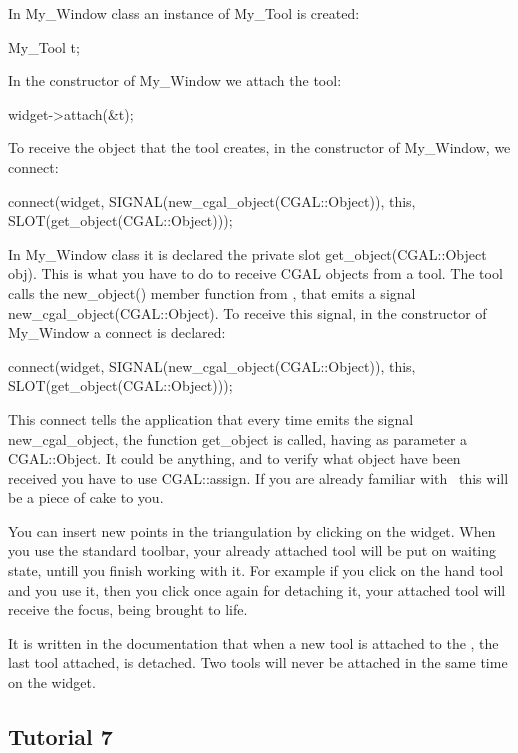 In My\_Window class an instance of My\_Tool is created:
\begin{ccExampleCode}
My_Tool t;
\end{ccExampleCode}
In the constructor of My\_Window we attach the tool:
\begin{ccExampleCode}
widget->attach(&t);
\end{ccExampleCode}

To receive the object that the tool creates, in the constructor of My\_Window, 
we connect:
\begin{ccExampleCode}
connect(widget, SIGNAL(new_cgal_object(CGAL::Object)), 
            this, SLOT(get_object(CGAL::Object)));
\end{ccExampleCode}
In My\_Window class it is declared the private slot get\_object(CGAL::Object obj). 
This is what you have to do to receive CGAL objects from a tool. The
tool calls the new\_object() member function from , that emits
a signal new\_cgal\_object(CGAL::Object). To receive this signal, in the
constructor of My\_Window a connect is declared:
\begin{ccExampleCode}
connect(widget, SIGNAL(new_cgal_object(CGAL::Object)), 
             this, SLOT(get_object(CGAL::Object)));
\end{ccExampleCode}

This connect tells the application that every time  emits the
signal new\_cgal\_object, the function get\_object is called, having as
parameter a CGAL::Object. It could be anything, and to verify what
object have been received you have to use CGAL::assign. If you are
already familiar with \cgal\ this will be a piece of cake to you.

You can insert new points in the triangulation by clicking on the
widget. When you use the standard toolbar, your already attached tool
will be put on waiting state, untill you finish working with it. For
example if you click on the hand tool and you use it, then you click
once again for detaching it, your attached tool will receive the
focus, being brought to life.

It is written in the documentation that when a new tool is attached to the
, the last tool attached, is detached. Two tools will
never be attached in the same time on the widget.

\subsection*{Tutorial 7}

